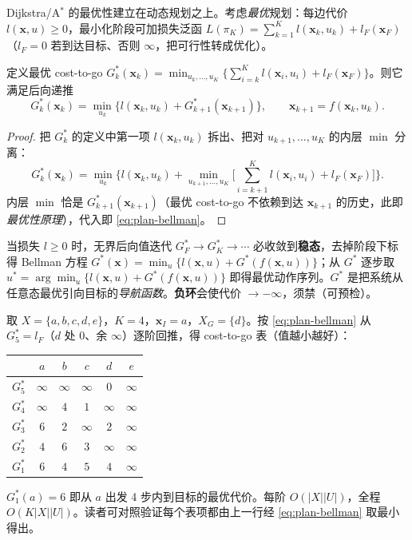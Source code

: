 Dijkstra/A$^*$ 的最优性建立在动态规划之上。考虑\emph{最优}规划：每边代价 $l(\mathbf{x},u)\ge0$，最小化阶段可加损失泛函 $L(\pi_K)=\sum_{k=1}^K l(\mathbf{x}_k,u_k)+l_F(\mathbf{x}_F)$（$l_F=0$ 若到达目标、否则 $\infty$，把可行性转成优化）。

\begin{theorem}\label{thm:plan-bellman}
定义最优 cost-to-go $G_k^*(\mathbf{x}_k)=\min_{u_k,\dots,u_K}\{\sum_{i=k}^K l(\mathbf{x}_i,u_i)+l_F(\mathbf{x}_F)\}$。则它满足后向递推
\begin{equation}
  G_k^*(\mathbf{x}_k)=\min_{u_k}\big\{l(\mathbf{x}_k,u_k)+G_{k+1}^*(\mathbf{x}_{k+1})\big\},\qquad\mathbf{x}_{k+1}=f(\mathbf{x}_k,u_k).
  \label{eq:plan-bellman}
\end{equation}
\end{theorem}
\begin{proof}
把 $G_k^*$ 的定义中第一项 $l(\mathbf{x}_k,u_k)$ 拆出、把对 $u_{k+1},\dots,u_K$ 的内层 $\min$ 分离：
\[
  G_k^*(\mathbf{x}_k)=\min_{u_k}\Big\{l(\mathbf{x}_k,u_k)+\min_{u_{k+1},\dots,u_K}\big[\textstyle\sum_{i=k+1}^K l(\mathbf{x}_i,u_i)+l_F(\mathbf{x}_F)\big]\Big\}.
\]
内层 $\min$ 恰是 $G_{k+1}^*(\mathbf{x}_{k+1})$（最优 cost-to-go 不依赖到达 $\mathbf{x}_{k+1}$ 的历史，此即\emph{最优性原理}），代入即 \cref{eq:plan-bellman}。
\end{proof}

\noindent 当损失 $l\ge0$ 时，无界后向值迭代 $G_F^*\to G_K^*\to\cdots$ 必收敛到\textbf{稳态}，去掉阶段下标得 Bellman 方程 $G^*(\mathbf{x})=\min_u\{l(\mathbf{x},u)+G^*(f(\mathbf{x},u))\}$；从 $G^*$ 逐步取 $u^*=\arg\min_u\{l(\mathbf{x},u)+G^*(f(\mathbf{x},u))\}$ 即得最优动作序列。$G^*$ 是把系统从任意态最优引向目标的\emph{导航函数}。\textbf{负环}会使代价 $\to-\infty$，须禁（可预检）。

\begin{example}[五态后向值迭代]\label{ex:plan-vi}
取 $X=\{a,b,c,d,e\}$，$K=4$，$\mathbf{x}_I=a$，$X_G=\{d\}$。按 \cref{eq:plan-bellman} 从 $G_5^*=l_F$（$d$ 处 0、余 $\infty$）逐阶回推，得 cost-to-go 表（值越小越好）：
\begin{center}\small
\begin{tabular}{l|ccccc}
\toprule
 & $a$ & $b$ & $c$ & $d$ & $e$ \\
\midrule
$G_5^*$ & $\infty$ & $\infty$ & $\infty$ & $0$ & $\infty$ \\
$G_4^*$ & $\infty$ & $4$ & $1$ & $\infty$ & $\infty$ \\
$G_3^*$ & $6$ & $2$ & $\infty$ & $2$ & $\infty$ \\
$G_2^*$ & $4$ & $6$ & $3$ & $\infty$ & $\infty$ \\
$G_1^*$ & $6$ & $4$ & $5$ & $4$ & $\infty$ \\
\bottomrule
\end{tabular}
\end{center}
$G_1^*(a)=6$ 即从 $a$ 出发 4 步内到目标的最优代价。每阶 $O(|X||U|)$，全程 $O(K|X||U|)$。读者可对照验证每个表项都由上一行经 \cref{eq:plan-bellman} 取最小得出。
\end{example}

